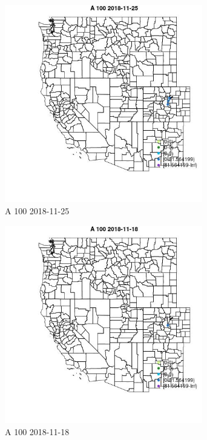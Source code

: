 \begin{figure} 
\centering  
\includegraphics[width=0.77\textwidth]{Code_Outputs/Report_ML_input_PM25_Step4_part_e_de_duplicated_aveswNAs_MapObsA_1002018-11-25.jpg} 
\caption{\label{fig:Report_ML_input_PM25_Step4_part_e_de_duplicated_aveswNAsMapObsA_1002018-11-25}A 100 2018-11-25} 
\end{figure} 
 

\begin{figure} 
\centering  
\includegraphics[width=0.77\textwidth]{Code_Outputs/Report_ML_input_PM25_Step4_part_e_de_duplicated_aveswNAs_MapObsA_1002018-11-18.jpg} 
\caption{\label{fig:Report_ML_input_PM25_Step4_part_e_de_duplicated_aveswNAsMapObsA_1002018-11-18}A 100 2018-11-18} 
\end{figure} 
 

